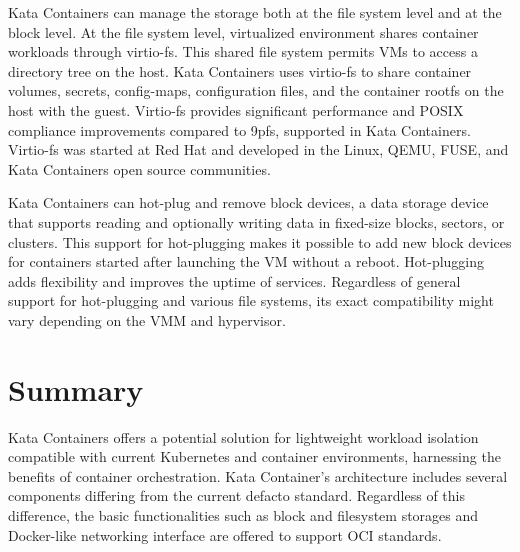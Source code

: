 Kata Containers can manage the storage both at the file system level and at the block level. At the file system level, virtualized environment shares container workloads through virtio-fs. This shared file system permits VMs to access a directory tree on the host. Kata Containers uses virtio-fs to share container volumes, secrets, config-maps, configuration files, and the container rootfs on the host with the guest. Virtio-fs provides significant performance and POSIX compliance improvements compared to 9pfs, supported in Kata Containers. Virtio-fs was started at Red Hat and developed in the Linux, QEMU, FUSE, and Kata Containers open source communities. \cite{virtio-fs-Kata}\cite{virtio-fs}

Kata Containers can hot-plug and remove block devices, a data storage device that supports reading and optionally writing data in fixed-size blocks, sectors, or clusters. This support for hot-plugging makes it possible to add new block devices for containers started after launching the VM without a reboot. Hot-plugging adds flexibility and improves the uptime of services. Regardless of general support for hot-plugging and various file systems, its exact compatibility might vary depending on the VMM and hypervisor. \cite{KataContainersArchitecture}\cite{KataContainersVirtualization}

\section{Summary}

Kata Containers offers a potential solution for lightweight workload isolation compatible with current Kubernetes and container environments, harnessing the benefits of container orchestration. Kata Container's architecture includes several components differing from the current defacto standard. Regardless of this difference, the basic functionalities such as block and filesystem storages and Docker-like networking interface are offered to support OCI standards.